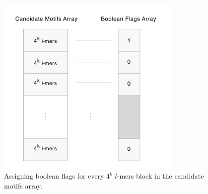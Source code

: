 \begin{figure}[h]
	\centering
	\includegraphics[width=3.5in]{contents/00_images/boolean-flags}\vspace*{5pt}
	
	\caption{Assigning boolean flags for every $4^k$ $l$-mers block in the candidate motifs array.}
	\label{fig:boolean-flags}
\end{figure}